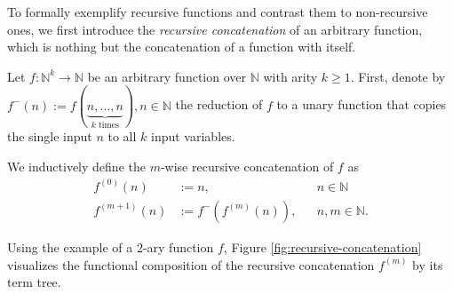 
To formally exemplify recursive functions and contrast them to non-recursive ones, we first introduce the \textit{recursive concatenation} of an arbitrary function, which is nothing but the concatenation of a function with itself.
\begin{definition}
	\label{def:recursive-concatenation}
	Let $f:\mathbb{N}^k\to\mathbb{N}$ be an arbitrary function over $\mathbb{N}$ with arity $k\geq 1$.
	First, denote by $f^{-}(n):=f(\underbrace{n,\dots,n}_{k \text{ times}}),n\in\mathbb{N}$ the reduction of $f$ to a unary function that copies the single input $n$ to all $k$ input variables.
	
	We inductively define the $m$-wise recursive concatenation of $f$ as
	\begin{align}
		f^{(0)}(n)&:=n, && n\in\mathbb{N}\\
		f^{(m+1)}(n)&:=f^{-}(f^{(m)}(n)),&& n,m\in\mathbb{N}.
	\end{align}
\end{definition}
Using the example of a $2$-ary function $f$, Figure \ref{fig:recursive-concatenation} visualizes the functional composition of the recursive concatenation $f^{(m)}$ by its term tree.
